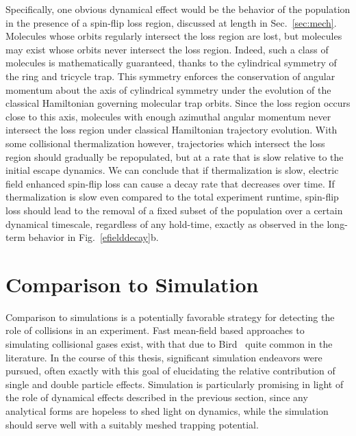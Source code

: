 Specifically, one obvious dynamical effect would be the behavior of the population in the presence of a spin-flip loss region, discussed at length in Sec.~\ref{sec:mech}.
Molecules whose orbits regularly intersect the loss region are lost, but molecules may exist whose orbits never intersect the loss region.
Indeed, such a class of molecules is mathematically guaranteed, thanks to the cylindrical symmetry of the ring and tricycle trap. 
This symmetry enforces the conservation of angular momentum about the axis of cylindrical symmetry under the evolution of the classical Hamiltonian governing molecular trap orbits.
Since the loss region occurs close to this axis, molecules with enough azimuthal angular momentum never intersect the loss region under classical Hamiltonian trajectory evolution.
With some collisional thermalization however, trajectories which intersect the loss region should gradually be repopulated, but at a rate that is slow relative to the initial escape dynamics.
We can conclude that if thermalization is slow, electric field enhanced spin-flip loss can cause a decay rate that decreases over time.
If thermalization is slow even compared to the total experiment runtime, spin-flip loss should lead to the removal of a fixed subset of the population over a certain dynamical timescale, regardless of any hold-time, exactly as observed in the long-term behavior in Fig.~\ref{efielddecay}b.

\section{Comparison to Simulation}

Comparison to simulations is a potentially favorable strategy for detecting the role of collisions in an experiment.
Fast mean-field based approaches to simulating collisional gases exist, with that due to Bird~\cite{Bird1976} quite common in the literature.
In the course of this thesis, significant simulation endeavors were pursued, often exactly with this goal of elucidating the relative contribution of single and double particle effects.
Simulation is particularly promising in light of the role of dynamical effects described in the previous section, since any analytical forms are hopeless to shed light on dynamics, while the simulation should serve well with a suitably meshed trapping potential.

